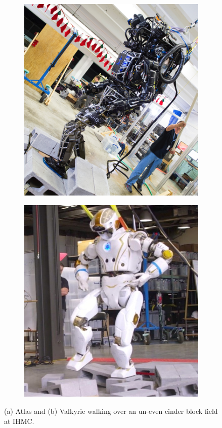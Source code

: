 \begin{figure}
\centering
  \begin{subfigure}{0.49\textwidth}
  \centering
  \includegraphics[width=.6\linewidth]{STYLESTUFF/AtlasOld1.png}
   \caption{}
    \label{fig:atlas}
  \end{subfigure}
  \begin{subfigure}{0.49\textwidth}
    \centering
  \includegraphics[width=.6\linewidth]{STYLESTUFF/Valkyrie1.png}
  \caption{}
   \label{fig:valkyrie}
  \end{subfigure}
  \caption{(a) Atlas \cite{oldatlas} and (b) Valkyrie \cite{valkyrie} walking over an un-even cinder block field at \ac{IHMC}. }
  \label{fig:robots}
\end{figure}

